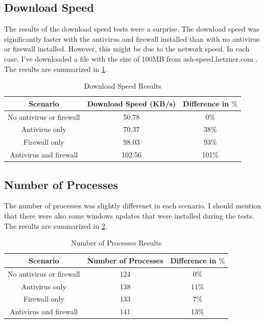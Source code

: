 \documentclass[runningheads,a4paper,english]{llncs}[2022/01/12]
\begin{document}
\subsection{Download Speed}
\label{sec:download}

\par The results of the download speed tests were a surprise. The download
speed was significantly faster with the antivirus and firewall installed than
with no antivirus or firewall installed. However, this might be due to the
network speed. In each case, I've downloaded a file with the size of 100MB from
ash-speed.hetzner.com \cite{HetznerSpeed}. The results are summarized in
\cref{tab:download}.

\begin{table}[h]
\centering
  \begin{tabular}{|c|c|c|}
    \hline
    Scenario & Download Speed (KB/s) & Difference in $\%$ \\
    \hline
    No antivirus or firewall & 50.78 & 0\% \\
    Antivirus only & 70.37 & 38\% \\
    Firewall only & 98.03 & 93\% \\
    Antivirus and firewall & 102.56 & 101\% \\
    \hline
  \end{tabular}
  \caption{Download Speed Results}
  \label{tab:download}
\end{table}

\subsection{Number of Processes}
\label{sec:processes}

\par The number of processes was slightly differenet in each scenario. I should
mention that there were also some windows updates that were installed during
the tests. The results are summarized in \cref{tab:processes}.

\begin{table}[h]
\centering
  \begin{tabular}{|c|c|c|}
    \hline
    Scenario & Number of Processes & Difference in $\%$ \\
    \hline
    No antivirus or firewall & 124 & 0\% \\
    Antivirus only & 138 &  11\% \\
    Firewall only & 133 & 7\% \\
    Antivirus and firewall & 141 & 13\% \\
    \hline
  \end{tabular}
  \caption{Number of Processes Results}
  \label{tab:processes}
\end{table}
\end{document}
